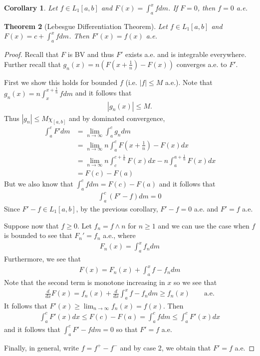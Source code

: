 \documentclass[11pt]{amsart}
\newtheorem{theorem}{Theorem}[section]
\newtheorem{corollary}[theorem]{Corollary}
\theoremstyle{definition}
\numberwithin{equation}{section}
\begin{document}
\begin{corollary}
    Let $f\in L_1[a,b]$ and $F(x)=\int_a^xfdm$. If $F=0$, then $f=0$ a.e.
\end{corollary}
\begin{theorem}[Lebesgue Differentiation Theorem]
    Let $f\in L_1[a,b]$ and $F(x)=c+\int_a^xfdm$. Then $F'(x)=f(x)$ a.e.
\end{theorem}
\begin{proof}
    Recall that $F$ is BV and thus $F'$ exists a.e. and is integrable everywhere. Further recall that $g_n(x)=n(F(x+\frac{1}{n})-F(x))$ converges a.e. to $F'$.

    First we show this holds for bounded $f$ (i.e. $|f|\le M$ a.e.). Note that $g_n(x)=n\int_x^{x+\frac{1}{n}}fdm$ and it follows that
    \begin{align*}
        |g_n(x)|\le M.
    \end{align*}
    Thus $|g_n|\le M\chi_{[a,b]}$ and by dominated convergence,
    \begin{align*}
        \int_a^cF'dm&=\lim_{n\to\infty}\int_a^cg_ndm\\
        &=\lim_{n\to\infty}n\int_a^cF(x+\frac{1}{n})-F(x)dx\\
        &=\lim_{n\to\infty}n\int_c^{c+\frac{1}{n}}F(x)dx-n\int_a^{a+\frac{1}{n}}F(x)dx\\
        &=F(c)-F(a)
    \end{align*}
    But we also know that $\int_a^cfdm=F(c)-F(a)$ and it follows that
    \begin{align*}
        \int_a^c(F'-f)dm=0
    \end{align*}
    Since $F'-f\in L_1[a,b]$, by the previous corollary, $F'-f=0$ a.e. and $F'=f$ a.e.

    Suppose now that $f\ge 0$. Let $f_n=f\land n$ for $n\ge 1$ and we can use the case when $f$ is bounded to see that $F_n'=f_n$ a.e., where
    \begin{align*}
        F_n(x)=\int_a^xf_ndm
    \end{align*}
    Furthermore, we see that
    \begin{align*}
        F(x)=F_n(x)+\int_a^xf-f_ndm
    \end{align*}
    Note that the second term is monotone increasing in $x$ so we see that
    \begin{align*}
        \frac{d}{dx}F(x)=f_n(x)+\frac{d}{dx}\int_a^xf-f_ndm\ge f_n(x)\qquad \text{a.e.}
    \end{align*}
    It follows that $F'(x)\ge \lim_{n\to\infty}f_n(x)=f(x)$. Then
    \begin{align*}
        \int_a^cF'(x)dx\le F(c)-F(a)=\int_a^cfdm\le \int_a^cF'(x)dx
    \end{align*}
    and it follows that $\int_a^cF'-fdm=0$ so that $F'=f$ a.e.

    Finally, in general, write $f=f^+-f^-$ and by case 2, we obtain that $F'=f$ a.e.
\end{proof}
\end{document}
